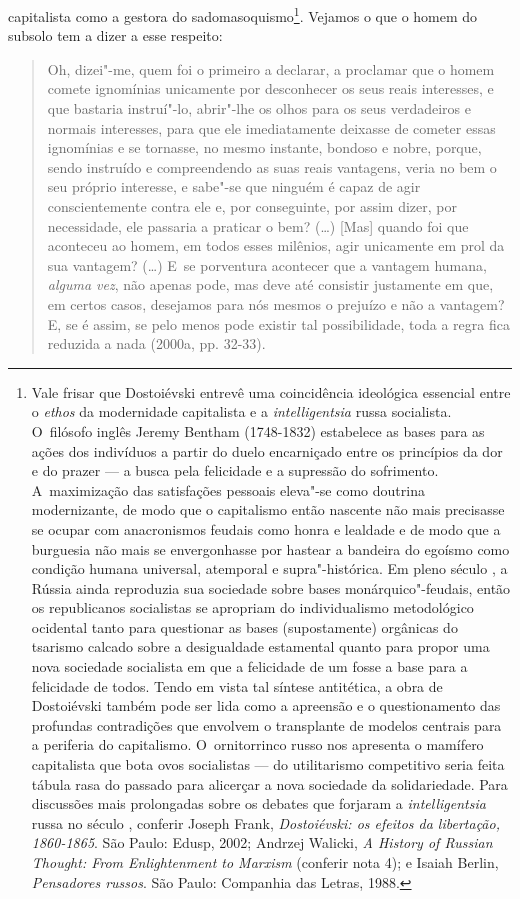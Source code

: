 capitalista como a gestora do sadomasoquismo\footnote{Vale frisar que
  Dostoiévski entrevê uma coincidência ideológica essencial entre o
  \emph{ethos} da modernidade capitalista e a \emph{intelligentsia}
  russa socialista. O~filósofo inglês Jeremy Bentham (1748-1832)
  estabelece as bases para as ações dos indivíduos a partir do duelo
  encarniçado entre os princípios da dor e do prazer --- a busca pela
  felicidade e a supressão do sofrimento. A~maximização das satisfações
  pessoais eleva"-se como doutrina modernizante, de modo que o
  capitalismo então nascente não mais precisasse se ocupar com
  anacronismos feudais como honra e lealdade e de modo que a burguesia
  não mais se envergonhasse por hastear a bandeira do egoísmo como
  condição humana universal, atemporal e supra"-histórica. Em pleno
  século , a Rússia ainda reproduzia sua sociedade sobre bases
  monárquico"-feudais, então os republicanos socialistas se apropriam do
  individualismo metodológico ocidental tanto para questionar as bases
  (supostamente) orgânicas do tsarismo calcado sobre a desigualdade
  estamental quanto para propor uma nova sociedade socialista em que a
  felicidade de um fosse a base para a felicidade de todos. Tendo em
  vista tal síntese antitética, a obra de Dostoiévski também pode ser
  lida como a apreensão e o questionamento das profundas contradições
  que envolvem o transplante de modelos centrais para a periferia do
  capitalismo. O~ornitorrinco russo nos apresenta o mamífero capitalista
  que bota ovos socialistas --- do utilitarismo competitivo seria feita
  tábula rasa do passado para alicerçar a nova sociedade da
  solidariedade. Para discussões mais prolongadas sobre os debates que
  forjaram a \emph{intelligentsia} russa no século , conferir Joseph
  Frank, \emph{Dostoiévski: os efeitos da libertação, 1860-1865}. São
  Paulo: Edusp, 2002; Andrzej Walicki, \emph{A History of Russian
  Thought: From Enlightenment to Marxism} (conferir nota 4); e Isaiah
  Berlin, \emph{Pensadores russos}. São Paulo: Companhia das Letras,
  1988.}. Vejamos o que o homem do subsolo tem a dizer a esse respeito:

\begin{quote}
Oh, dizei"-me, quem foi o primeiro a declarar, a proclamar que o homem
comete ignomínias unicamente por desconhecer os seus reais interesses, e
que bastaria instruí"-lo, abrir"-lhe os olhos para os seus verdadeiros e
normais interesses, para que ele imediatamente deixasse de cometer essas
ignomínias e se tornasse, no mesmo instante, bondoso e nobre, porque,
sendo instruído e compreendendo as suas reais vantagens, veria no bem o
seu próprio interesse, e sabe"-se que ninguém é capaz de agir
conscientemente contra ele e, por conseguinte, por assim dizer, por
necessidade, ele passaria a praticar o bem? (\ldots) {[}Mas{]} quando foi
que aconteceu ao homem, em todos esses milênios, agir unicamente em prol
da sua vantagem? (\ldots) E~se porventura acontecer que a vantagem humana,
\emph{alguma vez}, não apenas pode, mas deve até consistir justamente em
que, em certos casos, desejamos para nós mesmos o prejuízo e não a
vantagem? E, se é assim, se pelo menos pode existir tal possibilidade,
toda a regra fica reduzida a nada (2000a, pp. 32-33).
\end{quote}

